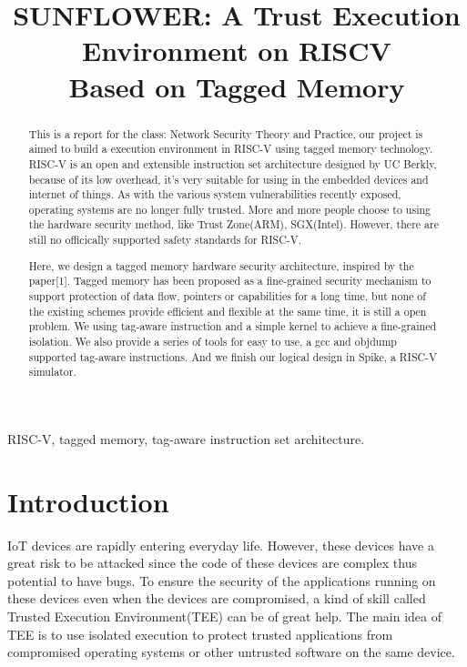 \documentclass[conference]{IEEEtran}
\begin{document}
\title{\LARGE SUNFLOWER: A Trust Execution Environment on RISCV \\Based on Tagged Memory}
\author{ }

\maketitle



\begin{abstract}
This is a report for the class: Network Security Theory and Practice, our project is aimed to build a execution environment in RISC-V using tagged memory technology. RISC-V is an open and extensible instruction set architecture designed by UC Berkly, because of its low overhead, it's very suitable for using in the embedded devices and internet of things. As with the various system vulnerabilities recently exposed, operating systems are no longer fully trusted. More and more people choose to using the hardware security method, like Trust Zone(ARM), SGX(Intel). However, there are still no officically supported safety standards for RISC-V.

Here, we design a tagged memory hardware security architecture, inspired by the paper[1]. Tagged memory has been proposed as a fine-grained security mechanism to support protection of data flow, pointers or capabilities for a long time, but none of the existing schemes provide efficient and flexible at the same time, it is still a open problem. We using tag-aware instruction and a simple kernel to achieve a fine-grained isolation. We also provide a series of tools for easy to use, a gcc and objdump supported tag-aware instructions. And we finish our logical design in Spike, a RISC-V simulator.
\end{abstract}

\begin{keywords}
RISC-V, tagged memory, tag-aware instruction set architecture.
\end{keywords}



\section{Introduction}
IoT devices are rapidly entering everyday life. However, these devices have a great risk to be attacked since the code of these devices are complex thus potential to have bugs. To ensure the security of the applications running on these devices even when the devices are compromised, a kind of skill called Trusted Execution Environment(TEE) can be of great help. The main idea of TEE is to use isolated execution to protect trusted applications from compromised operating systems or other untrusted software on the same device.
\end{document}
